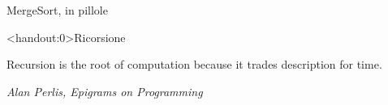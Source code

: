 \begin{OnlySlides}{MergeSort, in pillole}
\begin{center}
\end{center}
\end{OnlySlides}


\begin{frame}<handout:0>{Ricorsione}

\setlength{}
\epigraph{\alert{Recursion is the root of computation because it trades description for time.}
}{\textit{Alan Perlis, Epigrams on Programming}}


\begin{center}
\end{center}

\end{frame}

